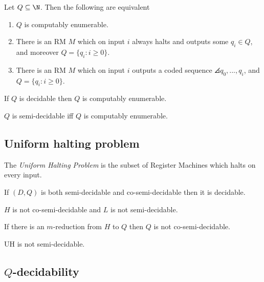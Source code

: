 \documentclass{article}
\begin{document}
\begin{theorem*}
	Let $Q\subseteq\N$. Then the following are equivalent
	\begin{enumerate}
		\item $Q$ is computably enumerable.
		\item There is an RM $M$ which on input $i$ always halts and outputs some $q_i\in Q$,
		      and moreover $Q=\{q_i : i\geq 0\}$.
		\item There is an RM $M$ which on input $i$ outputs a coded sequence $\angles{q_0,...,q_i}$,
		      and $Q=\{q_i:i\geq 0\}$.
	\end{enumerate}
\end{theorem*}

\begin{theorem*}[Notes I.25]
	If $Q$ is decidable then $Q$ is computably enumerable.
\end{theorem*}

\begin{theorem*}[Notes I.26, I.27]
	$Q$ is semi-decidable iff $Q$ is computably enumerable.
\end{theorem*}

\subsection{Uniform halting problem}

\begin{definition*}[UH]
	The \emph{Uniform Halting Problem} is the subset of Register Machines
	which halts on every input.
\end{definition*}

\begin{theorem*}[Notes I.28]
	If $(D,Q)$ is both semi-decidable and co-semi-decidable then it is decidable.
\end{theorem*}

\begin{corollary*}
	$H$ is not co-semi-decidable and $L$ is not semi-decidable.
\end{corollary*}

\begin{corollary*}
	If there is an $m$-reduction from $H$ to $Q$ then $Q$ is not co-semi-decidable.
\end{corollary*}

\begin{theorem*}[Notes I.31]
	UH is not semi-decidable.
\end{theorem*}

\subsection{$Q$-decidability}
\end{document}
